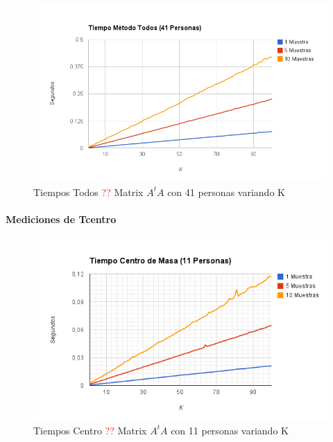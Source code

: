 \begin{figure}[H]
\includegraphics[width=1\textwidth]{img/imagef.png}
     \caption{Tiempos Todos \textcolor{red}{??} Matrix $A^tA$ con 41 personas variando K}
     \label{fig:figura1}
\end{figure}

\paragraph{Mediciones de Tcentro }

\begin{figure}[H]
\includegraphics[width=1\textwidth]{img/imageg.png}
     \caption{Tiempos Centro \textcolor{red}{??} Matrix $A^tA$ con 11 personas variando K}
     \label{fig:figura1}
\end{figure}

